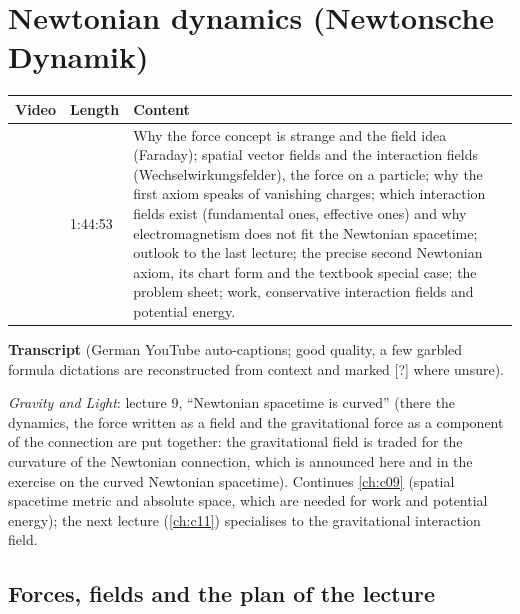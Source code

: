 \chapter{Newtonian dynamics (Newtonsche Dynamik)}\label{ch:c10}
\begin{paracol}{2}

\begin{sources}
\begin{tabularx}{\linewidth}{@{}l l L@{}}
\toprule
\textbf{Video} & \textbf{Length} & \textbf{Content}\\
\midrule
{} & 1:44:53 & Why the force concept is strange and the field idea (Faraday); spatial vector fields and the interaction fields (Wechselwirkungsfelder), the force on a particle;
why the first axiom speaks of vanishing charges; which interaction fields exist (fundamental ones, effective ones) and why electromagnetism does not fit the Newtonian spacetime;
outlook to the last lecture; the precise second Newtonian axiom, its chart form and the textbook special case; the problem sheet; work, conservative interaction fields and potential energy.\\
\bottomrule
\end{tabularx}

\smallskip
\textbf{Transcript}  (German YouTube auto-captions; good quality, a few garbled formula dictations are reconstructed from context and marked [?] where unsure).
\end{sources}

\begin{reading}
\emph{Gravity and Light}: lecture 9, ``Newtonian spacetime is curved'' (there the dynamics, the force written as a field and the gravitational force as a component of the connection are put together: the gravitational field is
traded for the curvature of the Newtonian connection, which is announced here and in the exercise on the curved Newtonian spacetime). Continues \cref{ch:c09} (spatial spacetime metric and absolute space, which are needed for work and potential energy);
the next lecture (\cref{ch:c11}) specialises to the gravitational interaction field.
\end{reading}

\section{Forces, fields and the plan of the lecture}\label{sec:nd-plan}


\end{paracol}

